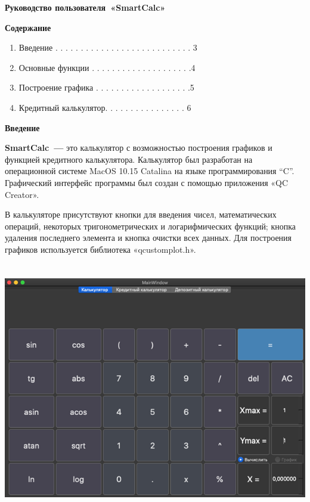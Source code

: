 \documentclass[]{article}
\date{}
\begin{document}
\begin{center}

\Huge

\textbf{Руководство пользователя~«SmartCalc»}
\end{center}
\pagebreak[5]
\huge
\textbf{Содержание}

\LARGE
\begin{enumerate}
\def\labelenumi{\arabic{enumi}.}
\item
\textmd{Введение . . . . . . . . . . . . . . . . . . . . . . . . . . . 3}
\item
\textmd{Основные
  функции . . . . . . . . . . . . . . . . . . . .4}
\item
\textmd{Построение
  графика . . . . . . . . . . . . . . . . . . .5}
\item
\textmd{Кредитный
  калькулятор. . . . . . . . . . . . . . . . 6}
\end{enumerate}
\pagebreak[5]
\huge
\textbf{Введение}
\newline
\LARGE

\textbf{SmartCalc~---} это калькулятор с возможностью построения
графиков и функцией кредитного калькулятора. Калькулятор был разработан
на операционной системе MacOS 10.15 Catalina на языке программирования
``C''. Графический интерфейс программы был создан с помощью приложения
«QC Creator».

В калькуляторе присутствуют кнопки для введения чисел, математических
операций, некоторых тригонометрических и логарифмических функций; кнопка
удаления последнего элемента и кнопка очистки всех данных. Для
построения графиков используется библиотека «qcustomplot.h».

\includegraphics[width=6.17653in,height=4.33611in]{media/image1.png}
\end{document}
